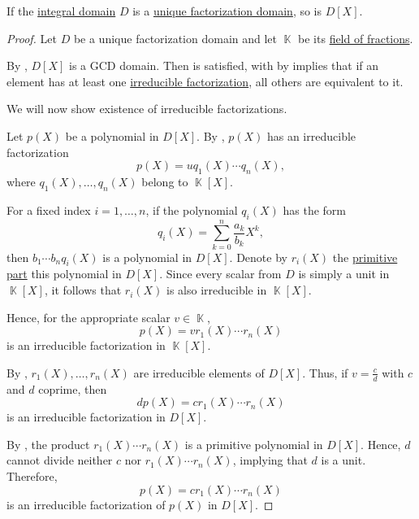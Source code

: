 \begin{proposition}\label{thm:polynomial_ring_over_ufd}
  If the \hyperref[def:integral_domain]{integral domain} \( D \) is a \hyperref[def:unique_factorization_domain]{unique factorization domain}, so is \( D[X] \).
\end{proposition}
\begin{proof}
  Let \( D \) be a unique factorization domain and let \( \BbbK \) be its \hyperref[thm:field_of_fractions]{field of fractions}.

  By , \( D[X] \) is a GCD domain. Then  is satisfied, with by  implies that if an element has at least one \hyperref[def:irreducible_factorization]{irreducible factorization}, all others are equivalent to it.

  We will now show existence of irreducible factorizations.

  Let \( p(X) \) be a polynomial in \( D[X] \). By , \( p(X) \) has an irreducible factorization
  \begin{equation*}
    p(X) = u q_1(X) \cdots q_n(X),
  \end{equation*}
  where \( q_1(X), \ldots, q_n(X) \) belong to \( \BbbK[X] \).

  For a fixed index \( i = 1, \ldots, n \), if the polynomial \( q_i(X) \) has the form
  \begin{equation*}
    q_i(X) = \sum_{k=0}^n \frac {a_k} {b_k} X^k,
  \end{equation*}
  then \( b_1 \cdots b_n q_i(X) \) is a polynomial in \( D[X] \). Denote by \( r_i(X) \) the \hyperref[def:polynomial_content]{primitive part} this polynomial in \( D[X] \). Since every scalar from \( D \) is simply a unit in \( \BbbK[X] \), it follows that \( r_i(X) \) is also irreducible in \( \BbbK[X] \).

  Hence, for the appropriate scalar \( v \in \BbbK \),
  \begin{equation*}
    p(X) = v r_1(X) \cdots r_n(X)
  \end{equation*}
  is an irreducible factorization in \( \BbbK[X] \).

  By , \( r_1(X), \ldots, r_n(X) \) are irreducible elements of \( D[X] \). Thus, if \( v = \tfrac c d \) with \( c \) and \( d \) coprime, then
  \begin{equation*}
    d p(X) = c r_1(X) \cdots r_n(X)
  \end{equation*}
  is an irreducible factorization in \( D[X] \).

  By , the product \( r_1(X) \cdots r_n(X) \) is a primitive polynomial in \( D[X] \). Hence, \( d \) cannot divide neither \( c \) nor \( r_1(X) \cdots r_n(X) \), implying that \( d \) is a unit. Therefore,
  \begin{equation*}
    p(X) = c r_1(X) \cdots r_n(X)
  \end{equation*}
  is an irreducible factorization of \( p(X) \) in \( D[X] \).
\end{proof}

